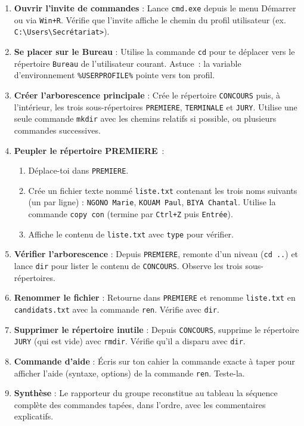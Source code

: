 \documentclass[11pt]{article}
\begin{document}
\begin{enumerate}
    \item \textbf{Ouvrir l'invite de commandes} : Lance \texttt{cmd.exe} depuis le menu Démarrer ou via \texttt{Win+R}. Vérifie que l'invite affiche le chemin du profil utilisateur (ex. \texttt{C:\textbackslash Users\textbackslash Secrétariat>}).
    \item \textbf{Se placer sur le Bureau} : Utilise la commande \texttt{cd} pour te déplacer vers le répertoire \texttt{Bureau} de l'utilisateur courant. Astuce~: la variable d'environnement \texttt{\%USERPROFILE\%} pointe vers ton profil.
    \item \textbf{Créer l'arborescence principale} : Crée le répertoire \texttt{CONCOURS} puis, à l'intérieur, les trois sous-répertoires \texttt{PREMIERE}, \texttt{TERMINALE} et \texttt{JURY}. Utilise une seule commande \texttt{mkdir} avec les chemins relatifs si possible, ou plusieurs commandes successives.
    \item \textbf{Peupler le répertoire PREMIERE}~:
    \begin{enumerate}
        \item Déplace-toi dans \texttt{PREMIERE}.
        \item Crée un fichier texte nommé \texttt{liste.txt} contenant les trois noms suivants (un par ligne) : \texttt{NGONO Marie}, \texttt{KOUAM Paul}, \texttt{BIYA Chantal}. Utilise la commande \texttt{copy con} (termine par \texttt{Ctrl+Z} puis \texttt{Entrée}).
        \item Affiche le contenu de \texttt{liste.txt} avec \texttt{type} pour vérifier.
    \end{enumerate}
    \item \textbf{Vérifier l'arborescence} : Depuis \texttt{PREMIERE}, remonte d'un niveau (\texttt{cd ..}) et lance \texttt{dir} pour lister le contenu de \texttt{CONCOURS}. Observe les trois sous-répertoires.
    \item \textbf{Renommer le fichier} : Retourne dans \texttt{PREMIERE} et renomme \texttt{liste.txt} en \texttt{candidats.txt} avec la commande \texttt{ren}. Vérifie avec \texttt{dir}.
    \item \textbf{Supprimer le répertoire inutile} : Depuis \texttt{CONCOURS}, supprime le répertoire \texttt{JURY} (qui est vide) avec \texttt{rmdir}. Vérifie qu'il a disparu avec \texttt{dir}.
    \item \textbf{Commande d'aide} : Écris sur ton cahier la commande exacte à taper pour afficher l'aide (syntaxe, options) de la commande \texttt{ren}. Teste-la.
    \item \textbf{Synthèse} : Le rapporteur du groupe reconstitue au tableau la séquence complète des commandes tapées, dans l'ordre, avec les commentaires explicatifs.
\end{enumerate}
\end{document}
